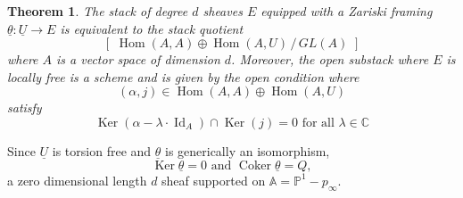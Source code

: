 \documentclass{amsart}
\newtheorem{theorem}{Theorem}[section]
\theoremstyle{definition}
\newcommand{\CC} {{\mathbb C}}          %
\renewcommand{\AA} {{\mathbb A}}
\newcommand{\PP}{\mathbb{P}}
\newcommand{\Hom}{\operatorname{Hom}}
\newcommand{\Ker}{\operatorname{Ker}}
\newcommand{\Coker}{\operatorname{Coker}}
\newcommand{\UL}[1]{\underline{#1}}
\newcommand{\Id}{\operatorname{Id}}
\begin{document}
\begin{center}
\end{center}

\begin{theorem}\label{thm: stack of Zariski framed sheaves is
equivalent to stack of quiver representation}
The stack of degree $d$ sheaves $E$ equipped with a Zariski framing
$\UL{\theta}: \UL{U}\to E$ is equivalent to the stack quotient
\[
[\,\,\Hom (A,A)\oplus \Hom (A,U) \,/\, GL(A)\,\, ]
\]
where $A$ is a vector space of dimension $d$. Moreover, the open
substack where $E$ is locally free is a scheme and is given by the
open condition where 
\[
(\alpha ,j)\in \Hom (A,A)\oplus \Hom (A,U) 
\]
satisfy 
\begin{equation}\label{eqn: open condition involving ker j}
\Ker (\alpha -\lambda \cdot \Id_{A})\cap \Ker (j) = 0\text{ for all }\lambda \in \CC 
\end{equation}
\end{theorem}

\proof Since $\UL{U}$ is torsion free and $\UL{\theta}$ is generically
an isomorphism,
\[
\Ker \UL{\theta}=0\text{ and } \Coker \UL{\theta}=Q ,
\]
a zero dimensional length $d$ sheaf supported on $\AA=\PP^{1}-p_{\infty}$.
\end{document}
